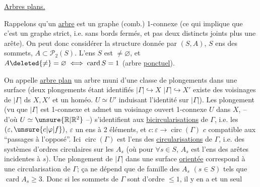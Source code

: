 \uline{Arbres plans.}\hfill{}

Rappelons qu'un \uline{arbre} est un graphe (comb.)
1-connexe (ce qui implique que c'est un graphe
strict, i.e. sans bords fermés, et pas deux 
distincts joints  plus une arête). On peut donc
considérer la structure donnée par $(S,A)$,
$S$ ens des sommets, $A\subset\mathcal P_2(S)$.  L'ens $S$ est $\ne\varnothing$,
et $A\deleted{\ne}=\varnothing\iff\operatorname{card}S=1$ (arbre \uline{ponctuel}).

On appelle \uline{arbre plan} un arbre muni d'une
classe de plongements dans une surface
(deux plongements étant identifiés $|\Gamma|\hookrightarrow X$
$|\Gamma|\hookrightarrow X'$  existe des voisinages de $|\Gamma|$ ds $X,X'$
et un homéo. $U\simeq U'$ induisant l'identité sur $|\Gamma|$).
Les  plongement (vu que $|\Gamma|$ est 1-connexe et
admet un voisinage ouvert 1-connexe $U$ dans $X$,
-- d'où $U\simeq\unsure{\mathbb R|\mathbb R^2}$ --) s'identifient aux \uline{bicircularisations}
de $\Gamma$, i.e. les   $(\varepsilon,\unsure{c|\varphi|f})$, $\varepsilon$ un
ens à 2 éléments,  et $c:\varepsilon\longrightarrow\operatorname{circ}(\Gamma)$
$c$ compatible aux ``passages à l'opposé''. Ici $\operatorname{circ}(\Gamma)$
est l'ens des \uline{circularisations} de $\Gamma$, i.e.
des systèmes d'ordres circulaires sur les
$A_s$ (où pour $\forall s\in S$, $A_s$ est l'ens des arêtes incidentes
à $s$). Une  plongement de $|\Gamma|$ dans une surface
\uline{orientée} correspond à une circularisation de
$\Gamma$; ça ne dépend que de  famille des
$A_s$ $(s\in S)$ tels que $\operatorname{card}A_s\geq3$. Donc si les sommets
de $\Gamma$ sont d'ordre $\leq1$, il y en a  et un seul
